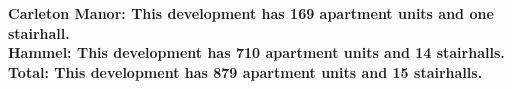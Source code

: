 \bf{Carleton Manor}: This development has 169 apartment units and one stairhall.\\\bf{Hammel}: This development has 710 apartment units and 14 stairhalls.\\\bf{Total}: This development has 879 apartment units and 15 stairhalls.\\